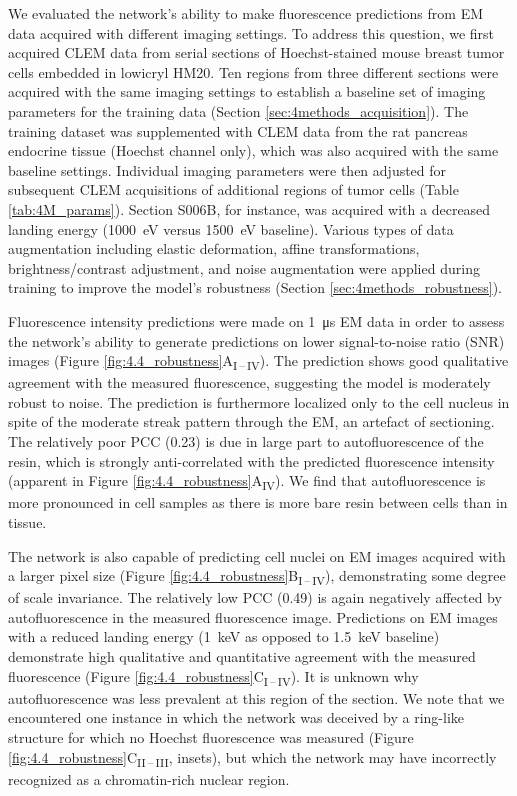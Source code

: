 We evaluated the network's ability to make fluorescence predictions from EM data acquired with different imaging settings. To address this question, we first acquired CLEM data from serial sections of Hoechst-stained mouse breast tumor cells embedded in lowicryl HM20. Ten regions from three different sections were acquired with the same imaging settings to establish a baseline set of imaging parameters for the training data (Section \ref{sec:4methods_acquisition}). The training dataset was supplemented with CLEM data from the rat pancreas endocrine tissue (Hoechst channel only), which was also acquired with the same baseline settings. Individual imaging parameters were then adjusted for subsequent CLEM acquisitions of additional regions of tumor cells (Table \ref{tab:4M_params}). Section S006B, for instance, was acquired with a decreased landing energy (\SI{1000}{\electronvolt} versus \SI{1500}{\electronvolt} baseline). Various types of data augmentation including elastic deformation, affine transformations, brightness/contrast adjustment, and noise augmentation were applied during training to improve the model's robustness (Section \ref{sec:4methods_robustness}).

Fluorescence intensity predictions were made on \SI{1}{\micro\second} EM data in order to assess the network's ability to generate predictions on lower signal-to-noise ratio (SNR) images (Figure \ref{fig:4.4_robustness}A\textsubscript{I\,--\,IV}). The prediction shows good qualitative agreement with the measured fluorescence, suggesting the model is moderately robust to noise. The prediction is furthermore localized only to the cell nucleus in spite of the moderate streak pattern through the EM, an artefact of sectioning. The relatively poor PCC (0.23) is due in large part to autofluorescence of the resin, which is strongly anti-correlated with the predicted fluorescence intensity (apparent in Figure \ref{fig:4.4_robustness}A\textsubscript{IV}). We find that autofluorescence is more pronounced in cell samples as there is more bare resin between cells than in tissue.

The network is also capable of predicting cell nuclei on EM images acquired with a larger pixel size (Figure \ref{fig:4.4_robustness}B\textsubscript{I\,--\,IV}), demonstrating some degree of scale invariance. The relatively low PCC (0.49) is again negatively affected by autofluorescence in the measured fluorescence image. Predictions on EM images with a reduced landing energy (\SI{1}{\kilo\electronvolt} as opposed to \SI{1.5}{\kilo\electronvolt} baseline) demonstrate high qualitative and quantitative agreement with the measured fluorescence (Figure \ref{fig:4.4_robustness}C\textsubscript{I\,--\,IV}). It is unknown why autofluorescence was less prevalent at this region of the section. We note that we encountered one instance in which the network was deceived by a ring-like structure for which no Hoechst fluorescence was measured (Figure \ref{fig:4.4_robustness}C\textsubscript{II\,--\,III}, insets), but which the network may have incorrectly recognized as a chromatin-rich nuclear region.

